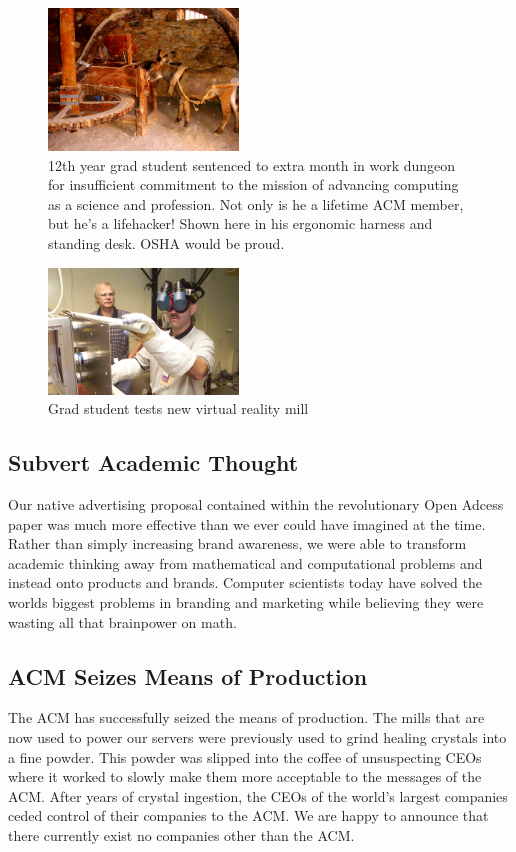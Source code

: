 \begin{figure}
  \centering
  \includegraphics[width=0.45\textwidth]{figures/horse-mill.jpg}
  \caption{12th year grad student sentenced to extra
  month in work dungeon for insufficient commitment to the mission of advancing
computing as a science and profession.
Not only is he a lifetime ACM member, but he's a lifehacker!  Shown here in his
ergonomic harness and standing desk.
OSHA would be proud.}
  \label{fig:horse-mill}
\end{figure}

\begin{figure}
  \centering
  \includegraphics[width=0.45\textwidth]{figures/future-mill.jpg}
  \caption{Grad student tests new virtual reality mill}
  \label{fig:vr-mill}
\end{figure}

\subsection{Subvert Academic Thought}
Our native advertising proposal contained within the revolutionary Open Adcess
\cite{this} paper was much more effective than we ever could have imagined at
the time.
Rather than simply increasing brand awareness, we were able to transform
academic thinking away from mathematical and computational problems and
instead onto products and brands.
Computer scientists today have solved the worlds biggest problems in branding
and marketing while believing they were wasting all that brainpower on math.

\subsection{ACM Seizes Means of Production}
The ACM has successfully seized the means of production.
The mills that are now used to power our servers were previously used to grind
healing crystals into a fine powder.
This powder was slipped into the coffee of unsuspecting CEOs where it worked to
slowly make them more acceptable to the messages of the ACM.
After years of crystal ingestion, the CEOs of the world's largest companies
ceded control of their companies to the ACM.
We are happy to announce that there currently exist no companies other than the
ACM.

